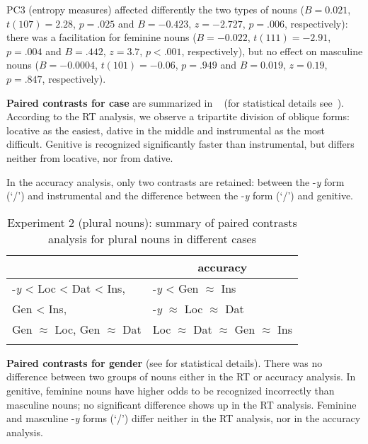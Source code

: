 \documentclass[output=paper, modfonts,newtxmath,hidelinks]{langscibook}
\begin{document}
PC3 (entropy measures) affected differently the two types of nouns ($B= 0.021$, $t(107)= 2.28$, $p= .025$ and $B = -0.423$, $z= -2.727$, $p= .006$, respectively): there was a facilitation for feminine nouns ($B= -0.022$, $t(111)= -2.91$, $p= .004$ and $B= .442$, $z= 3.7$, $p< .001$, respectively), but no effect on masculine nouns ($B= -0.0004$, $t(101)= -0.06$, $p= .949$ and $B= 0.019$, $z= 0.19$, $p= .847$, respectively).

\textbf{Paired contrasts for case} are summarized in ~ (for statistical details see~). According to the RT analysis, we observe a tripartite division of oblique forms: locative as the easiest, dative in the middle and instrumental as the most difficult. Genitive is recognized significantly faster than instrumental, but differs neither from locative, nor from dative. 

In the accuracy analysis, only two contrasts are retained: between the -\textit{y} form (`\nomm/\accc') and instrumental and the difference between the -\textit{y} form (`\nomm/\accc') and genitive.

\begin{table}
    \centering
	\caption{Experiment 2 (plural nouns): summary of paired contrasts analysis for plural nouns in different cases}
    \label{tab:casePlHierarchy}
    \begin{tabular}{*{2}l}
    \lsptoprule
    \multicolumn{1}{c}{RTs}	&	\multicolumn{1}{c}{accuracy}\\
    \midrule
    -\textit{y}	< Loc < Dat < Ins,	&	-\textit{y} < Gen $\approx$ Ins \\
    Gen < Ins,	&	-\textit{y} $\approx$ Loc $\approx$ Dat\\
    Gen $\approx$ Loc, Gen $\approx$ Dat & Loc $\approx$	Dat $\approx$ Gen $\approx$  Ins\\
    \lspbottomrule
    \end{tabular}
\end{table}    

\textbf{Paired contrasts for gender} (see  for statistical details). There was no difference between two groups of nouns either in the RT or accuracy analysis. In genitive, feminine  nouns have higher odds to be recognized incorrectly than masculine nouns; no significant difference shows up in the RT analysis. Feminine and masculine -\textit{y} forms (`\nomm/\accc') differ neither in the RT analysis, nor in the accuracy analysis. 
\end{document}
